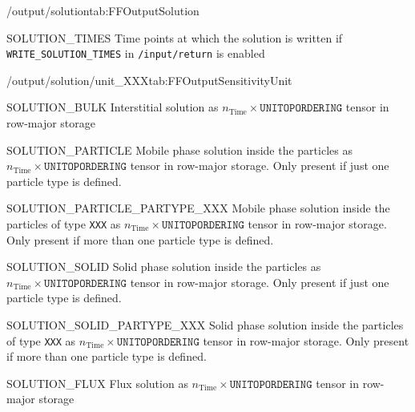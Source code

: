 \begin{groupscope}{/output/solution}{tab:FFOutputSolution}
  \begin{dataset}[type=double,unit={\si{\second}}]{SOLUTION\_TIMES}
    Time points at which the solution is written if \texttt{WRITE\_SOLUTION\_TIMES} in \texttt{/input/return} is enabled
  \end{dataset}
\end{groupscope}

\begin{groupscope}{/output/solution/unit\_XXX}{tab:FFOutputSensitivityUnit}
  \begin{dataset}[type=double,unit={\si{\mol\per\cubic\metre\of{IV}}}]{SOLUTION\_BULK}
    Interstitial solution as $n_{\text{Time}} \times \texttt{UNITOPORDERING}$ tensor in row-major storage
  \end{dataset}
  \begin{dataset}[type=double,unit={\si{\mol\per\cubic\metre\of{MP}}}]{SOLUTION\_PARTICLE}
    Mobile phase solution inside the particles as $n_{\text{Time}} \times \texttt{UNITOPORDERING}$ tensor in row-major storage.
    Only present if just one particle type is defined.
  \end{dataset}
  \begin{dataset}[type=double,unit={\si{\mol\per\cubic\metre\of{MP}}}]{SOLUTION\_PARTICLE\_PARTYPE\_XXX}
    Mobile phase solution inside the particles of type \texttt{XXX} as $n_{\text{Time}} \times \texttt{UNITOPORDERING}$ tensor in row-major storage.
    Only present if more than one particle type is defined.
  \end{dataset}
  \begin{dataset}[type=double,unit={\si{\mol\per\cubic\metre\of{MP}}}]{SOLUTION\_SOLID}
    Solid phase solution inside the particles as $n_{\text{Time}} \times \texttt{UNITOPORDERING}$ tensor in row-major storage.
    Only present if just one particle type is defined.
  \end{dataset}
  \begin{dataset}[type=double,unit={\si{\mol\per\cubic\metre\of{SP}}}]{SOLUTION\_SOLID\_PARTYPE\_XXX}
    Solid phase solution inside the particles of type \texttt{XXX} as $n_{\text{Time}} \times \texttt{UNITOPORDERING}$ tensor in row-major storage.
    Only present if more than one particle type is defined.
  \end{dataset}
  \begin{dataset}[type=double,unit={\si{\mol\per\square\metre\per\second}}]{SOLUTION\_FLUX}
    Flux solution as $n_{\text{Time}} \times \texttt{UNITOPORDERING}$ tensor in row-major storage

\end{dataset}
\end{groupscope}

